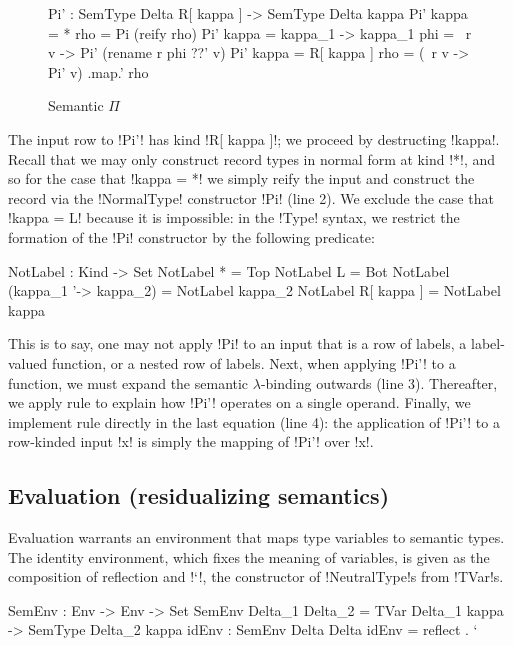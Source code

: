 \documentclass[sigplan,10pt,anonymous,review]{acmart}\settopmatter{printfolios=true,printccs=false,printacmref=false}
\begin{document}
\begin{figure}
\begin{agda}
Pi' : SemType Delta R[ kappa ] -> SemType Delta kappa
Pi' {kappa = *} rho = Pi (reify rho)
Pi' {kappa = kappa_1 -> kappa_1} phi = \ r v -> Pi' (rename r phi ??' v)
Pi' {kappa = R[ kappa ]} rho = (\ r v -> Pi' v) .map.' rho
\end{agda}
\caption{Semantic $\Pi$}
\label{fig:semantic-pi}
\end{figure}
 
The input row to !Pi'! has kind !R[ kappa ]!; we proceed by destructing !kappa!. Recall that we may only construct record types in normal form at kind !*!, and so for the case that !kappa = *! we simply reify the input and construct the record via the !NormalType! constructor !Pi! (line 2). We exclude the case that !kappa = L! because it is impossible: in the !Type! syntax, we restrict the formation of the !Pi! constructor by the following predicate:

\begin{agda}
NotLabel : Kind -> Set
NotLabel * = Top
NotLabel L = Bot
NotLabel (kappa_1 '-> kappa_2) = NotLabel kappa_2
NotLabel R[ kappa ] = NotLabel kappa
\end{agda}

This is to say, one may not apply !Pi! to an input that is a row of labels, a label-valued function, or a nested row of labels. Next, when applying !Pi'! to a function, we must expand the semantic $\lambda$-binding outwards (line 3). Thereafter, we apply rule  to explain how !Pi'! operates on a single operand. Finally, we implement rule \errule{$\Xi$} directly in the last equation (line 4): the application of !Pi'! to a row-kinded input !x! is simply the mapping of !Pi'!  over !x!.

\subsection{Evaluation (residualizing semantics)}
Evaluation warrants an environment that maps type variables to semantic types. The identity environment, which fixes the meaning of variables, is given as the composition of reflection and !`!, the constructor of !NeutralType!s from !TVar!s. 


\begin{agda}
SemEnv : Env -> Env -> Set
SemEnv Delta_1  Delta_2 = TVar Delta_1 kappa -> SemType Delta_2 kappa 
idEnv : SemEnv Delta Delta
idEnv = reflect . `
\end{agda}
\end{document}
